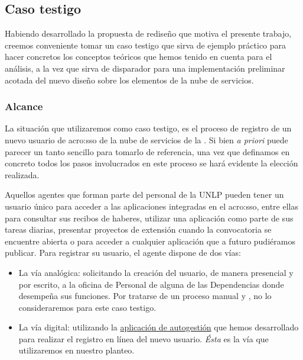\subsection{Caso testigo}
\label{caso-testigo}

Habiendo desarrollado la propuesta de rediseño que motiva el presente trabajo, creemos conveniente tomar un caso testigo que sirva de ejemplo práctico para hacer concretos los conceptos teóricos que hemos tenido en cuenta para el análisis, a la vez que sirva de disparador para una implementación preliminar acotada del nuevo diseño sobre los elementos de la nube de servicios.

\subsubsection{Alcance}

La situación que utilizaremos como caso testigo, es el proceso de registro de un nuevo usuario de \gls{acro:sso} de la nube de servicios de la {\unlp}. Si bien \textit{a priori} puede parecer un tanto sencillo para tomarlo de referencia, una vez que definamos en concreto todos los pasos involucrados en este proceso se hará evidente la elección realizada.

Aquellos agentes que forman parte del personal de la UNLP pueden tener un usuario único para acceder a las aplicaciones integradas en el \gls{acro:sso}, entre ellas para consultar sus recibos de haberes, utilizar una aplicación como parte de sus tareas diarias, presentar proyectos de extensión cuando la convocatoria se encuentre abierta o para acceder a cualquier aplicación que a futuro pudiéramos publicar. Para registrar su usuario, el agente dispone de dos vías:

\begin{itemize}
  \item La vía analógica: solicitando la creación del usuario, de manera presencial y por escrito, a la oficina de Personal de alguna de las Dependencias donde desempeña sus funciones. Por tratarse de un proceso manual y , no lo consideraremos para este caso testigo.

  \item La vía digital: utilizando la \hyperref[anexo:detalle-clientes:sso]{aplicación de autogestión} que hemos desarrollado para realizar el registro en línea del nuevo usuario. \textit{Ésta} es la vía que utilizaremos en nuestro planteo.
\end{itemize}

